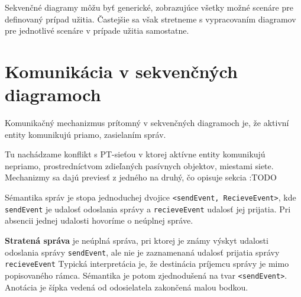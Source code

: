 Sekvenčné diagramy môžu byť generické, zobrazujúce všetky možné scenáre pre definovaný prípad užitia. Častejšie sa však stretneme s vypracovaním diagramov pre jednotlivé scenáre v prípade užitia samostatne.

\section{Komunikácia v sekvenčných diagramoch}

Komunikačný mechanizmus prítomný v sekvenčných diagramoch je, že 
aktivní entity komunikujú priamo, zasielaním správ. 
\begin{note}
	Tu nachádzame konflikt s PT-sieťou v ktorej aktívne entity komunikujú nepriamo, prostredníctvom zdieľaných pasívnych objektov, miestami siete. Mechanizmy sa dajú previesť z jedného na druhý, čo opisuje sekcia :TODO
\end{note}
Sémantika správ je stopa jednoduchej dvojice \lstinline{<sendEvent, RecieveEvent>}, kde \lstinline{sendEvent} je udalosť odoslania správy a \lstinline{recieveEvent} udalosť jej prijatia. Pri absencii jednej udalosti hovoríme o neúplnej správe.

\begin{defn}
	\textbf{Stratená správa} je neúplná správa, pri ktorej je známy výskyt udalosti odoslania správy \lstinline{sendEvent}, ale nie je zaznamenaná udalosť prijatia správy \lstinline{recieveEvent} 
	Typická interpretácia je, že destinácia príjemcu správy je mimo popisovaného rámca. Sémantika je potom zjednodušená na tvar 
	\lstinline{<sendEvent>}.
	Anotácia je šípka vedená od odosielatela zakončená malou bodkou.
\end{defn}

